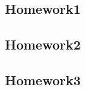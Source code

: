 \documentclass[main]{subfiles}
\begin{document}
\subsection{Homework1}

\newpage

\subsection{Homework2}

\newpage

\subsection{Homework3}

\newpage
\end{document}

